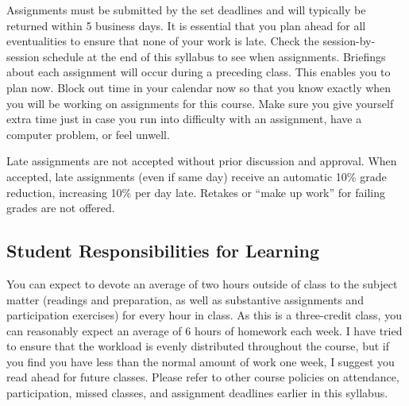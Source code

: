 \documentclass[11pt,]{article}
\begin{document}
Assignments must be submitted by the set deadlines and will typically be
returned within 5 business days. It is essential that you plan ahead for
all eventualities to ensure that none of your work is late. Check the
session-by-session schedule at the end of this syllabus to see when
assignments. Briefings about each assignment will occur during a
preceding class. This enables you to plan now. Block out time in your
calendar now so that you know exactly when you will be working on
assignments for this course. Make sure you give yourself extra time just
in case you run into difficulty with an assignment, have a computer
problem, or feel unwell.

Late assignments are not accepted without prior discussion and approval.
When accepted, late assignments (even if same day) receive an automatic
10\% grade reduction, increasing 10\% per day late. Retakes or ``make up
work'' for failing grades are not offered.

\subsection{Student Responsibilities for
Learning}\label{student-responsibilities-for-learning}

You can expect to devote an average of two hours outside of class to the
subject matter (readings and preparation, as well as substantive
assignments and participation exercises) for every hour in class. As
this is a three-credit class, you can reasonably expect an average of 6
hours of homework each week. I have tried to ensure that the workload is
evenly distributed throughout the course, but if you find you have less
than the normal amount of work one week, I suggest you read ahead for
future classes. Please refer to other course policies on attendance,
participation, missed classes, and assignment deadlines earlier in this
syllabus.
\end{document}
